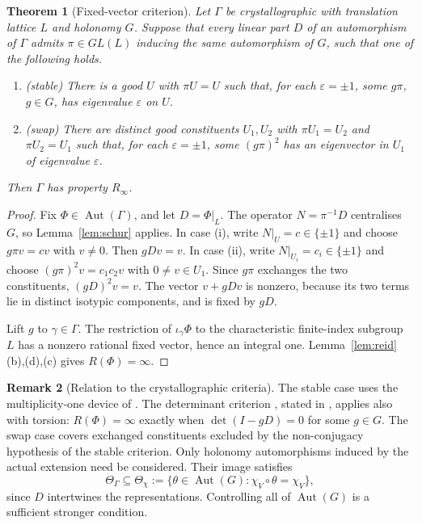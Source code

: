 \documentclass[11pt]{amsart}
\newtheorem{theorem}{Theorem}[section]
\theoremstyle{definition}
\newtheorem{remark}[theorem]{Remark}
\newcommand{\Aut}{\operatorname{Aut}}
\newcommand{\Rinf}{R_\infty}
\begin{document}
\begin{theorem}[Fixed-vector criterion]\label{thm:crit}\label{prop:lattice-criterion}
Let $\Gamma$ be crystallographic with translation lattice $L$ and holonomy $G$.
Suppose that every linear part $D$ of an automorphism of $\Gamma$ admits $\pi\in GL(L)$
inducing the same automorphism of $G$, such that one of the following holds.
\begin{enumerate}[label=(\roman*)]
\item\emph{(stable)} There is a good $U$ with $\pi U=U$ such that, for each $\varepsilon=\pm1$,
some $g\pi$, $g\in G$, has eigenvalue $\varepsilon$ on $U$.
\item\emph{(swap)} There are distinct good constituents $U_1,U_2$ with $\pi U_1=U_2$ and $\pi U_2=U_1$
such that, for each $\varepsilon=\pm1$, some $(g\pi)^2$ has an eigenvector in $U_1$ of eigenvalue $\varepsilon$.
\end{enumerate}
Then $\Gamma$ has property $\Rinf$.
\end{theorem}
\begin{proof}
Fix $\Phi\in\Aut(\Gamma)$, and let $D=\Phi|_L$.
The operator $N=\pi^{-1}D$ centralises $G$, so Lemma~\ref{lem:schur} applies.
In case (i), write $N|_U=c\in\{\pm1\}$ and choose $g\pi v=cv$ with $v\ne0$.
Then $gDv=v$.
In case (ii), write $N|_{U_i}=c_i\in\{\pm1\}$ and choose $(g\pi)^2v=c_1c_2v$ with
$0\ne v\in U_1$. Since $g\pi$ exchanges the two constituents, $(gD)^2v=v$.
The vector $v+gDv$ is nonzero, because its two terms lie in distinct isotypic components, and is fixed by $gD$.

Lift $g$ to $\gamma\in\Gamma$. The restriction of $\iota_\gamma\Phi$ to the characteristic
finite-index subgroup $L$ has a nonzero rational fixed vector, hence an integral one.
Lemma~\ref{lem:reid}(b),(d),(c) gives $R(\Phi)=\infty$.
\end{proof}

\begin{remark}[Relation to the crystallographic criteria]\label{rem:crystal}
The stable case uses the multiplicity-one device of \cite[Thm.~4.7]{DDP09}.
The determinant criterion \cite[Cor.~3.10]{DP11}, stated in \cite[Thm.~3.3]{DKT19}, applies also
with torsion: $R(\Phi)=\infty$ exactly when $\det(I-gD)=0$ for some $g\in G$.
The swap case covers exchanged constituents excluded by the non-conjugacy hypothesis of the stable criterion.
Only holonomy automorphisms induced by the actual extension need be considered. Their image satisfies
\[
 \Theta_\Gamma\subseteq\Theta_\chi
 :=\{\theta\in\Aut(G):\chi_V\circ\theta=\chi_V\},
\]
since $D$ intertwines the representations. Controlling all of $\Aut(G)$ is a sufficient stronger condition.
\end{remark}
\end{document}
